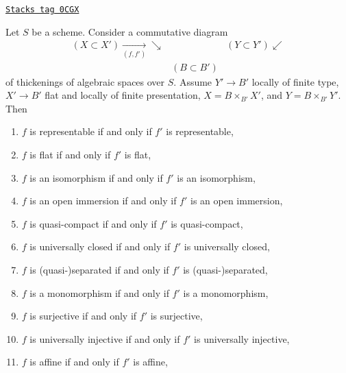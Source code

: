 \begin{lemma}
\label{spaces-more-morphisms-lemma-deform-property-fp-over-ft}
\href{https://stacks.math.columbia.edu/tag/0CGX}{\texttt{Stacks tag 0CGX}}

Let $S$ be a scheme. Consider a commutative diagram
$$
\begin{array}{ccc}(X \subset X') \underset{(f, f')}{\longrightarrow}\searrow &  & (Y \subset Y') \swarrow \\  & (B \subset B') & \end{array}
$$
of thickenings of algebraic spaces over $S$.
Assume $Y' \to B'$ locally of finite type,
$X' \to B'$ flat and locally of finite presentation,
$X = B \times_{B'} X'$, and $Y = B \times_{B'} Y'$. Then
\begin{enumerate}
\item $f$ is representable if and only if $f'$ is representable,
\label{spaces-more-morphisms-item-representable-fp-over-ft}
\item $f$ is flat if and only if $f'$ is flat,
\label{spaces-more-morphisms-item-flat-fp-over-ft}
\item $f$ is an isomorphism if and only if $f'$ is an isomorphism,
\label{spaces-more-morphisms-item-isomorphism-fp-over-ft}
\item $f$ is an open immersion if and only if $f'$ is an open immersion,
\label{spaces-more-morphisms-item-open-immersion-fp-over-ft}
\item $f$ is quasi-compact if and only if $f'$ is quasi-compact,
\label{spaces-more-morphisms-item-quasi-compact-fp-over-ft}
\item $f$ is universally closed if and only if $f'$ is universally closed,
\label{spaces-more-morphisms-item-universally-closed-fp-over-ft}
\item $f$ is (quasi-)separated if and only if $f'$ is (quasi-)separated,
\label{spaces-more-morphisms-item-separated-fp-over-ft}
\item $f$ is a monomorphism if and only if $f'$ is a monomorphism,
\label{spaces-more-morphisms-item-monomorphism-fp-over-ft}
\item $f$ is surjective if and only if $f'$ is surjective,
\label{spaces-more-morphisms-item-surjective-fp-over-ft}
\item $f$ is universally injective if and only if $f'$ is universally injective,
\label{spaces-more-morphisms-item-universally-injective-fp-over-ft}
\item $f$ is affine if and only if $f'$ is affine,

\end{enumerate}
\end{lemma}
